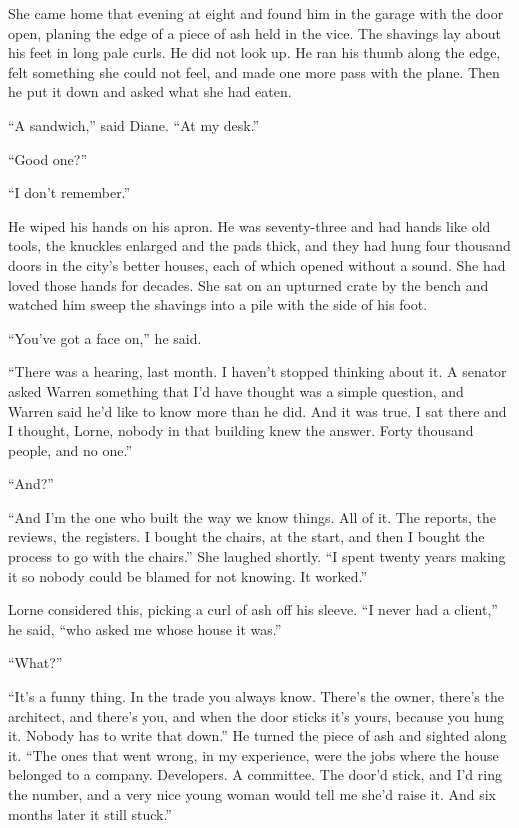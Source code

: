 She came home that evening at eight and found him in the garage with the door open, planing the edge of a piece of ash held in the vice. The shavings lay about his feet in long pale curls. He did not look up. He ran his thumb along the edge, felt something she could not feel, and made one more pass with the plane. Then he put it down and asked what she had eaten.

``A sandwich,'' said Diane. ``At my desk.''

``Good one?''

``I don't remember.''

He wiped his hands on his apron. He was seventy-three and had hands like old tools, the knuckles enlarged and the pads thick, and they had hung four thousand doors in the city's better houses, each of which opened without a sound. She had loved those hands for decades. She sat on an upturned crate by the bench and watched him sweep the shavings into a pile with the side of his foot.

``You've got a face on,'' he said.

``There was a hearing, last month. I haven't stopped thinking about it. A senator asked Warren something that I'd have thought was a simple question, and Warren said he'd like to know more than he did. And it was true. I sat there and I thought, Lorne, nobody in that building knew the answer. Forty thousand people, and no one.''

``And?''

``And I'm the one who built the way we know things. All of it. The reports, the reviews, the registers. I bought the chairs, at the start, and then I bought the process to go with the chairs.'' She laughed shortly. ``I spent twenty years making it so nobody could be blamed for not knowing. It worked.''

Lorne considered this, picking a curl of ash off his sleeve. ``I never had a client,'' he said, ``who asked me whose house it was.''

``What?''

``It's a funny thing. In the trade you always know. There's the owner, there's the architect, and there's you, and when the door sticks it's yours, because you hung it. Nobody has to write that down.'' He turned the piece of ash and sighted along it. ``The ones that went wrong, in my experience, were the jobs where the house belonged to a company. Developers. A committee. The door'd stick, and I'd ring the number, and a very nice young woman would tell me she'd raise it. And six months later it still stuck.''


